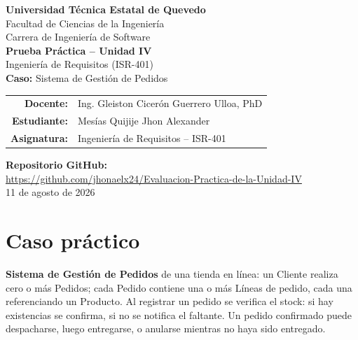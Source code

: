 \documentclass[12pt,a4paper]{article}
\begin{document}
    
    \begin{titlepage}
        \centering
        \vspace*{1cm}
        {\Large \textbf{Universidad Técnica Estatal de Quevedo}}\\[0.3cm]
        {\large Facultad de Ciencias de la Ingeniería}\\[0.3cm]
        {\large Carrera de Ingeniería de Software}\\[2cm]
    
        {\Huge \textbf{Prueba Práctica -- Unidad IV}}\\[0.5cm]
        {\LARGE Ingeniería de Requisitos (ISR-401)}\\[1.5cm]
    
        {\Large \textbf{Caso:} Sistema de Gestión de Pedidos}\\[2cm]
    
        \begin{tabular}{rl}
            \textbf{Docente:} & Ing. Gleiston Cicerón Guerrero Ulloa, PhD \\[0.2cm]
            \textbf{Estudiante:} & Mesías Quijije Jhon Alexander \\[0.2cm]
            \textbf{Asignatura:} & Ingeniería de Requisitos -- ISR-401 \\[0.5cm]
        \end{tabular}
    
            \vfill

    {\large \textbf{Repositorio GitHub:}}\\[0.2cm]
    \url{https://github.com/jhonaelx24/Evaluacion-Practica-de-la-Unidad-IV}\\[0.8cm]

  {\large 11 de agosto de 2026}
\end{titlepage}

    \tableofcontents
    \newpage
    
    \section{Caso práctico}
    
    \textbf{Sistema de Gestión de Pedidos} de una tienda en línea: un Cliente realiza cero o más Pedidos; cada Pedido contiene una o más Líneas de pedido, cada una referenciando un Producto. Al registrar un pedido se verifica el stock: si hay existencias se confirma, si no se notifica el faltante. Un pedido confirmado puede despacharse, luego entregarse, o anularse mientras no haya sido entregado.
    
\end{document}
